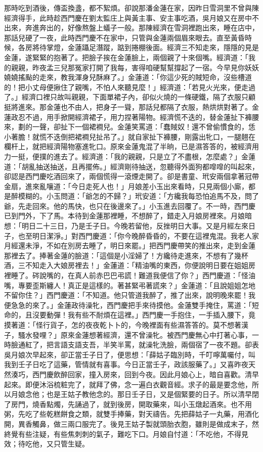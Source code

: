\begin{showcontents}{}
那時吃到酒後，傳盃換盞，都不絮煩。卻說那潘金蓮在家，因昨日雪洞里不曾與陳經濟得手，此時趁西門慶在劉太監庄上與黃主事、安主事吃酒，吳月娘又在房中不出來，奔進奔出的，好像熬盤上蟻子一般。那陳經濟在雪洞裡跑出來，睡在店中，那話兒硬了一夜，此時西門慶不在家中，只管與金蓮兩個眉來眼去。直至黃昏時候，各房將待掌燈，金蓮躡足潛蹤，踮到捲棚後面。經濟三不知走來，隱隱的見是金蓮，遂緊緊的抱著了。把臉子挨在金蓮臉上，兩個親了十來個嘴。經濟道：「我的親親，昨夜孟三兒那冤家打開了我每，害得咱硬幫幫撐起了一宿。今早見你妖妖嬈嬈搖颭的走來，教我渾身兒酥麻了。」金蓮道：「你這少死的賊短命，沒些槽道的！把小丈母便揪住了親嘴，不怕人來聽見麼！」經濟道：「若見火光來，便走過了。」經濟口裡只故叫親親，下面單裙子內，卻似火燒的一條硬鐵，隔了衣服只顧挺將進來。那金蓮也不由人，把身子一聳，那話兒都隔了衣服，熱烘烘對著了。金蓮政忍不過，用手掀開經濟裙子，用力捏著陽物。經濟慌不迭的，替金蓮扯下褲腰來，劃的一聲，卻扯下一個裙襇兒。金蓮笑罵道：「蠢賊奴！還不曾偷慣食的，恁小著膽！就慌不迭倒把裙襇兒扯吊了。」就自家扯下褲腰，剛露出牝口，一腿翹在欄杆上，就把經濟陽物塞進牝口。原來金蓮鬼混了半晌，已是濕答答的，被經濟用力一挺，便撲的進去了。經濟道：「我的親親，只是立了不盡根，怎麼處？」金蓮道：「胡亂抽送抽送，且再擺佈。」經濟剛待抽送，忽聽得外面狗都噑噑的叫起來，卻認是西門慶吃酒回來了，兩個慌得一滾煙走開了。卻是書童、玳安兩個拿著冠帶金扇，進來亂嚷道：「今日走死人也！」月娘差小玉出來看時，只見兩個小廝，都是醉模糊的。小玉問道：「爺怎的不歸？」玳安道：「方纔我每恐怕追馬不及，問了爺，先走回來。他的馬快，也只在後邊來了。」小玉進去回覆了。不一時，西門慶已到門外，下了馬。本待到金蓮那裡睡，不想醉了，錯走入月娘房裡來。月娘暗想：「明日二十三日，乃是壬子日。今晚若留他，反挫明日大事。又是月經左來日子，也至明日潔淨。」對西門慶道：「你今晚醉昏昏的，不要在這裡鬼混。我老人家月經還未淨，不如在別房去睡了，明日來罷。」把西門慶帶笑的推出來，走到金蓮那裡去了。捧著金蓮的臉道：「這個是小淫婦了！方纔待走進來，不想有了幾杯酒，三不知走入大娘房裡去！」金蓮道：「精油嘴的東西，你便說明日要在姐姐房裡睡了。硶說嘴的，在真人前赤巴巴弔謊！難道我便信了你？」西門慶道：「怪油嘴，專要歪斯纏人！真正是這樣的。著甚緊弔著謊來？」金蓮道：「且說姐姐怎地不留你住？」西門慶道：「不知道。他只管道我醉了，推了出來，說明晚來罷！我便急急的來了。」金蓮政待澡牝，西門慶把手來待摸他。金蓮雙手掩住，罵道：「短命的，且沒要動彈！我有些不耐煩在這裡。」西門慶一手抱住，一手插入腰下，竟摸著道：「怪行貨子，怎的夜夜乾卜卜的，今晚裡面有些濕答答的。莫不想著漢子，騷水發哩？」原來金蓮想著經濟，還不曾澡牝。被西門慶無心中打著心事，一時臉通紅了，把言語支語支吾，半笑半罵，就澡牝洗臉，兩個宿了一夜不題。卻表吳月娘次早起來，卻正當壬子日了，便思想：「薛姑子臨別時，千叮嚀萬囑付，叫我到壬子日吃了這藥，管情就有喜事。今日正當壬子，政該服藥了。」又喜昨夜天然湊巧，西門慶飲醉回家，撞入房來，回到今夜。因此月娘心上，暗自喜歡。清早起來。即便沐浴梳粧完了，就拜了佛，念一遍白衣觀音經。求子的最是要念他，所以月娘念他；也是王姑子教他念的。那日壬子日，又是個緊要的日子。所以清早閉了房門，燒香點燭，先誦過了，就到後房，開取藥來，叫小玉燉起酒來。也不用粥，先吃了些乾糕餅食之類，就雙手捧藥，對天禱告。先把薛姑子一丸藥，用酒化開，異香觸鼻，做三兩口服完了。後見王姑子製就頭胎衣胞，雖則是做成末子，然終覺有些注疑，有些焦刺刺的氣子，難吃下口。月娘自忖道：「不吃他，不得見效；待吃他，又只管生疑。
\end{showcontents}
